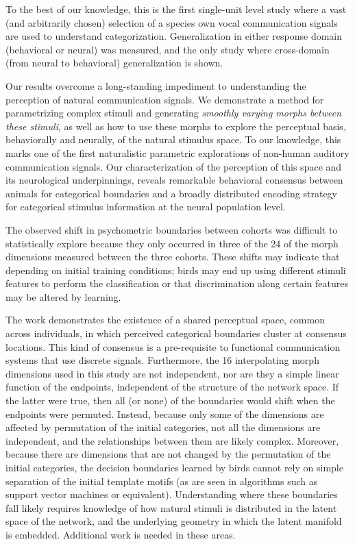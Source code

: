 To the best of our knowledge, this is the first single-unit level study where a vast (and arbitrarily chosen) selection of a species own vocal communication signals are used to understand categorization. Generalization in either response domain (behavioral or neural) was measured, and the only study where cross-domain (from neural to behavioral) generalization is shown.

Our results overcome a long-standing impediment to understanding the perception of natural communication signals. We demonstrate a method for parametrizing complex stimuli and generating \emph{smoothly varying morphs between these stimuli}, as well as how to use these morphs to explore the perceptual basis, behaviorally and neurally, of the natural stimulus space. To our knowledge, this marks one of the first naturalistic parametric explorations of non-human auditory communication signals. Our characterization of the perception of this space and its neurological underpinnings, reveals remarkable behavioral consensus between animals for categorical boundaries and a broadly distributed encoding strategy for categorical stimulus information at the neural population level.  

The observed shift in psychometric boundaries between cohorts was difficult to statistically explore because they only occurred in three of the 24 of the morph dimensions measured between the three cohorts. These shifts may indicate that depending on initial training conditions; birds may end up using different stimuli features to perform the classification or that discrimination along certain features may be altered by learning.

The work demonstrates the existence of a shared perceptual space, common across individuals, in which perceived categorical boundaries cluster at consensus locations.  This kind of consensus is a pre-requisite to functional communication systems that use discrete signals.  Furthermore, the 16 interpolating morph dimensions used in this study are not independent, nor are they a simple linear function of the endpoints, independent of the structure of the network space. If the latter were true, then all (or none) of the boundaries would shift when the endpoints were permuted. Instead, because only some of the dimensions are affected by permutation of the initial categories, not all the dimensions are independent, and the relationships between them are likely complex. Moreover, because there are dimensions that are not changed by the permutation of the initial categories, the decision boundaries learned by birds cannot rely on simple separation of the initial template motifs (as are seen in algorithms such as support vector machines or equivalent). Understanding where these boundaries fall likely requires knowledge of how natural stimuli is distributed in the latent space of the network, and the underlying geometry in which the latent manifold is embedded. Additional work is needed in these areas. \cite{tims paper}

